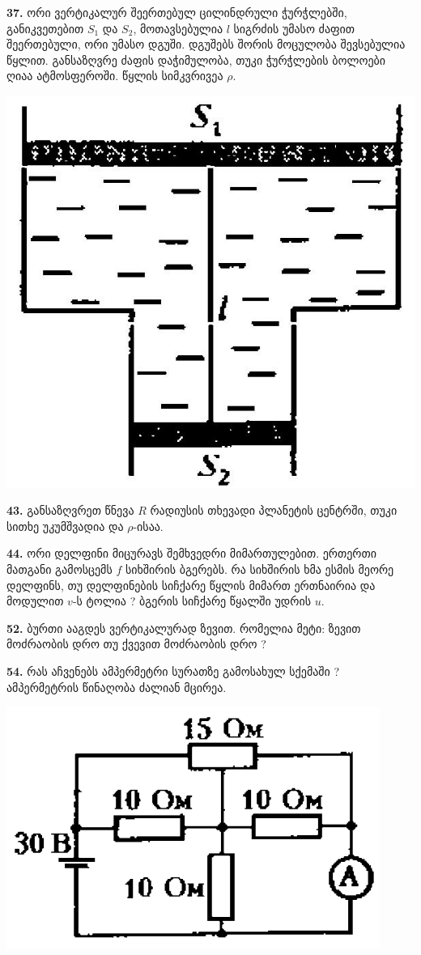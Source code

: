 \documentclass[12pt,a4paper,]{report}
\begin{document}
\textbf{37.} ორი ვერტიკალურ შეერთებულ ცილინდრული ჭურჭლებში, განიკვეთებით $S_1$ და $S_2$, მოთავსებულია $l$ სიგრძის უმასო ძაფით შეერთებული, ორი უმასო დგუში. დგუშებს შორის მოცულობა შევსებულია წყლით. განსაზღვრე ძაფის დაჭიმულობა, თუკი ჭურჭლების ბოლოები ღიაა ატმოსფეროში. წყლის სიმკვრივეა $\rho$.
		\begin{center}
			\includegraphics[scale=0.2]{images/F37.jpg}
		\end{center}

\textbf{43.} განსაზღვრეთ წნევა $R$ რადიუსის თხევადი პლანეტის ცენტრში, თუკი სითხე უკუმშვადია და $\rho$-ისაა.

\textbf{44.} ორი დელფინი მიცურავს შემხვედრი მიმართულებით. ერთერთი მათგანი გამოსცემს $f$ სიხშირის ბგერებს. რა სიხშირის ხმა ესმის მეორე დელფინს, თუ დელფინების სიჩქარე წყლის მიმართ ერთნაირია და მოდულით $v$-ს ტოლია ? ბგერის სიჩქარე წყალში უდრის $u$.

\textbf{52.} ბურთი ააგდეს ვერტიკალურად ზევით. რომელია მეტი: ზევით მოძრაობის დრო თუ ქვევით მოძრაობის დრო ?

\textbf{54.} რას აჩვენებს ამპერმეტრი სურათზე გამოსახულ სქემაში ? ამპერმეტრის წინაღობა ძალიან მცირეა. 
		\begin{center}
			\includegraphics[scale=0.4]{images/54.png}
		\end{center}
	
\end{document}
